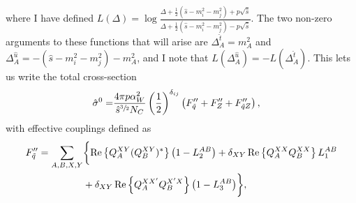 \documentclass[../main.tex]{subfiles}
\begin{document}
where I have defined \(L(\Delta) = \log\frac{\Delta + \frac{1}{2}(\hat{s}-m_i^2-m_j^2) + p\sqrt{\hat{s}}}{\Delta + \frac{1}{2}(\hat{s}-m_i^2-m_j^2) - p\sqrt{\hat{s}}}\).
The two non-zero arguments to these functions that will arise are \(\Delta^{\hat{t}}_A = m_A^2\) and \(\Delta^{\hat{u}}_A = -(\hat{s}-m_i^2-m_j^2) - m_A^2\), and I note that \(L(\Delta^{\hat{u}}_A) = -L(\Delta^{\hat{t}}_A)\).
This lets us write the total cross-section
\begin{align}
  \label{part:eq:born}
  \hat\sigma^0 = & \frac{4 \pi p \alpha_W^2}{\hat{s}^{\sfrac{3}{2}} N_C} \left(\frac{1}{2}\right)^{\delta_{ij}} \left(F^{\prime\prime}_{\tilde{q}} + F^{\prime\prime}_Z + F^{\prime\prime}_{\tilde{q}Z}\right),
\end{align}
with effective couplings defined as
\begin{align}
  \label{part:eq:eff_coupling_Fq}
  \nonumber
  F^{\prime\prime}_{\tilde{q}} = \sum_{A,B,X,Y} & \biggl\{\operatorname{Re}\left\{Q_A^{XY} (Q_B^{XY})^\ast\right\} \left(1 - L_2^{AB}\right) + \delta_{XY}\operatorname{Re}\left\{Q_A^{XX} Q_B^{XX}\right\} L_1^{AB} \\
                                                & + \delta_{XY} \operatorname{Re}\left\{Q_A^{XX^\prime} Q_B^{X^\prime X}\right\} \left(1 - L_3^{AB}\right) \biggr\},
\end{align}
\end{document}
